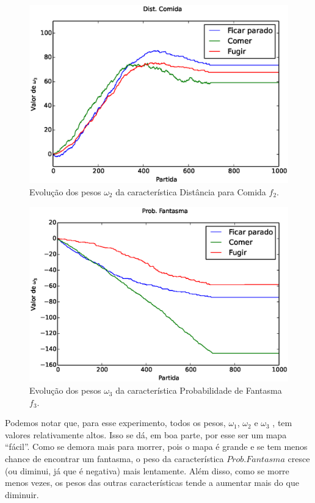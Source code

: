 \begin{figure}[H]
    \centering
    \includegraphics[width=\linewidth]{images/3_behaviors_original_map/weights____pol__DistComida}
    \caption{Evolução dos pesos $ \omega_2 $ da característica Distância para Comida $ f_2 $.}
    \label{img:3ComportamentosMapaOriginal:PesoDistComida}
\end{figure}

\begin{figure}[H]
    \centering
    \includegraphics[width=\linewidth]{images/3_behaviors_original_map/weights____pol__ProbFantasma}
    \caption{Evolução dos pesos $ \omega_3 $ da característica Probabilidade de Fantasma $ f_3 $.}
    \label{img:3ComportamentosMapaOriginal:PesoProbFantasma}
\end{figure}

Podemos notar que, para esse experimento, todos os pesos, $ \omega_1 $, $ \omega_2 $ e $ \omega_3 $ , tem valores relativamente altos. Isso se dá, em boa parte, por esse ser um mapa ``fácil''. Como se demora mais para morrer, pois o mapa é grande e se tem menos chance de encontrar um fantasma, o peso da característica $ Prob. Fantasma $ cresce (ou diminui, já que é negativa) mais lentamente. Além disso, como se morre menos vezes, os pesos das outras características tende a aumentar mais do que diminuir.

